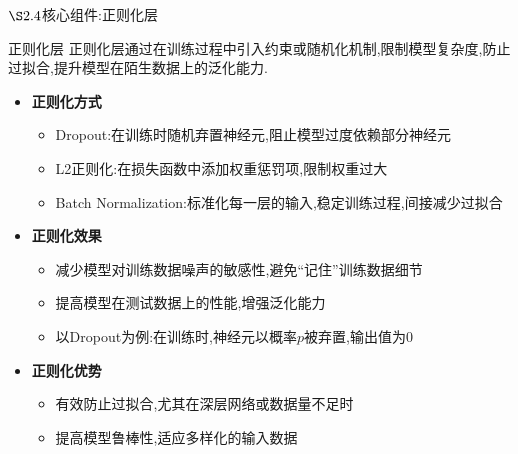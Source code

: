 \documentclass{beamer}
\begin{document}
\begin{frame}{$\S2.4$核心组件:正则化层}
    \begin{block}{正则化层}
        正则化层通过在训练过程中引入约束或随机化机制,限制模型复杂度,防止过拟合,提升模型在陌生数据上的泛化能力.
    \end{block}
    \begin{itemize}
        \item \textbf{正则化方式}
        \begin{itemize}
            \item Dropout:在训练时随机弃置神经元,阻止模型过度依赖部分神经元
            \item L2正则化:在损失函数中添加权重惩罚项,限制权重过大
            \item Batch Normalization:标准化每一层的输入,稳定训练过程,间接减少过拟合
        \end{itemize}
        \item \textbf{正则化效果}
        \begin{itemize}
            \item 减少模型对训练数据噪声的敏感性,避免“记住”训练数据细节
            \item 提高模型在测试数据上的性能,增强泛化能力
            \item 以Dropout为例:在训练时,神经元以概率$p$被弃置,输出值为0
        \end{itemize}
        \item \textbf{正则化优势}
        \begin{itemize}
            \item 有效防止过拟合,尤其在深层网络或数据量不足时
            \item 提高模型鲁棒性,适应多样化的输入数据
        \end{itemize}
    \end{itemize}
\end{frame}
\end{document}

